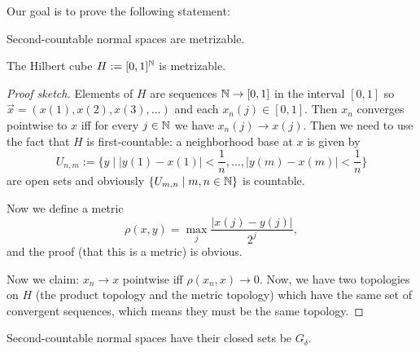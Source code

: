 
\lecture{}

Our goal is to prove the following statement:

\begin{node}
Second-countable normal spaces are metrizable.
\end{node}

\begin{lemma}\label{lemma:fall:lec6:l1}
The Hilbert cube $H:=[0,1]^{\mathbb{N}}$ is metrizable.
\end{lemma}

\begin{proof}[Proof sketch]
Elements of $H$ are sequences $\mathbb{N}\to[0,1]$ in the interval $[0,1]$ so
$\vec{x}=(x(1),x(2),x(3),\dots)$ and each $x_{n}(j)\in[0,1]$. Then
$x_{n}$ converges pointwise to $x$ iff for every $j\in\mathbb{N}$ we have
$x_{n}(j)\to x(j)$. Then we need to use the fact that $H$ is
first-countable: a neighborhood base at $x$ is given by
\begin{equation}
U_{n,m}:=\{y\mid |y(1)-x(1)|<\frac{1}{n},\dots,|y(m)-x(m)|<\frac{1}{n}\}
\end{equation}
are open sets and obviously $\{U_{m,n}\mid m,n\in\mathbb{N}\}$ is countable.

Now we define a metric
\begin{equation}
\rho(x,y)=\max_{j}\frac{|x(j)-y(j)|}{2^{j}},
\end{equation}
and the proof (that this is a metric) is obvious.

Now we claim: $x_{n}\to x$ pointwise iff $\rho(x_{n},x)\to0$. Now, we
have two topologies on $H$ (the product topology and the metric
topology) which have the same set of convergent sequences, which means
they must be the same topology.
\end{proof}

\begin{lemma}\label{lemma:fall:lec6:l2}
Second-countable normal spaces have their closed sets be $G_{\delta}$.
\end{lemma}

